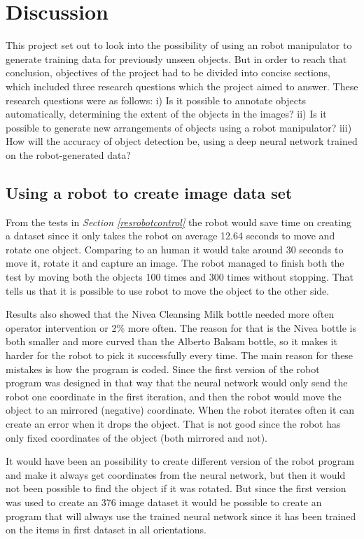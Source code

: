 \chapter{Discussion}
This project set out to look into the possibility of using an robot manipulator to generate training data for previously unseen objects. But in order to reach that conclusion, objectives of the project had to be divided into concise sections, which included three research questions which the project aimed to answer. These research questions were as follows: i) Is it possible to annotate objects automatically, determining the extent of the objects in the images? ii) Is it possible to generate new arrangements of objects using a robot manipulator? iii) How will the accuracy of object detection be, using a deep neural network trained on the robot-generated data?


\section{Using a robot to create image data set}
From the tests in \textit{Section \ref{resrobotcontrol}} the robot would save time on creating a dataset since it only takes the robot on average 12.64 seconds to move and rotate one object. Comparing to an human it would take around 30 seconds to move it, rotate it and capture an image. The robot managed to finish both the test by moving both the objects 100 times and 300 times without stopping. That tells us that it is possible to use robot to move the object to the other side. 

Results also showed that the Nivea Cleansing Milk bottle needed more often operator intervention or 2\% more often. The reason for that is the Nivea bottle is both smaller and more curved than the Alberto Balsam bottle, so it makes it harder for the robot to pick it successfully every time. The main reason for these mistakes is how the program is coded. Since the first version of the robot program was designed in that way that the neural network would only send the robot one coordinate in the first iteration, and then the robot would move the object to an mirrored (negative) coordinate. When the robot iterates often it can create an error when it drops the object. That is not good since the robot has only fixed coordinates of the object (both mirrored and not).

It would have been an possibility to create different version of the robot program and make it always get coordinates from the neural network, but then it would not been possible to find the object if it was rotated. But since the first version was used to create an 376 image dataset it would be possible to create an program that will always use the trained neural network since it has been trained on the items in first dataset in all orientations.


